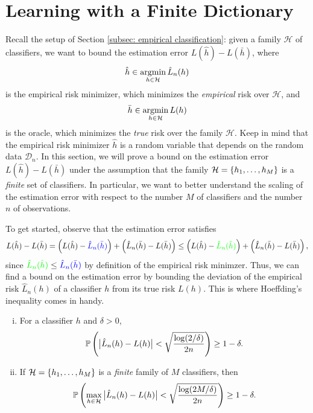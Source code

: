 \section{Learning with a Finite Dictionary}

Recall the setup of Section \ref{subsec: empirical classification}: given a family $\mathcal{H}$ of classifiers, we want to bound the estimation error $L(\hat h) - L(\bar h)$, where
\[
    \hat h \in \operatorname*{argmin}_{h \in \mathcal{H}} \hat L_n(h)
\]
is the empirical risk minimizer, which minimizes the \emph{empirical} risk over $\mathcal{H}$, and
\[
    \bar h \in \operatorname*{argmin}_{h \in \mathcal{H}} L(h)
\]
is the oracle, which minimizes the \emph{true} risk over the family $\mathcal{H}$. Keep in mind that the empirical risk minimizer $\hat h$ is a random variable that depends on the random data $\mathcal{D}_n$. In this section, we will prove a bound on the estimation error $L(\hat h) - L(\bar h)$ under the assumption that the family $\mathcal{H} = \left\{h_1, \dots, h_M\right\}$ is a \emph{finite} set of classifiers. In particular, we want to better understand the scaling of the estimation error with respect to the number $M$ of classifiers and the number $n$ of observations.

To get started, observe that the estimation error satisfies
\[
    L(\hat h) - L(\bar h) %
    = \left(L(\hat h) - {\color{blue} \hat L_n(\bar h)}\right) + \left(\hat L_n(\bar h) - L(\bar h)\right) %
    \leq \left(L(\hat h) - {\color{green} \hat L_n(\hat h)}\right) + \left(\hat L_n(\bar h) - L(\bar h)\right),
\]
since ${\color{green} \hat L_n(\hat h)} \leq {\color{blue} \hat L_n(\bar h)}$ by definition of the empirical risk minimzer. Thus, we can find a bound on the estimation error by bounding the deviation of the empirical risk $\hat L_n(h)$ of a classifier $h$ from its true risk $L(h)$. This is where Hoeffding's inequality comes in handy.

\begin{theorem}
\label{thm: empirical vs true risk}
\begin{enumerate}[(i)]
    \item For a classifier $h$ and $\delta > 0$,
    \[
        \mathbb{P}\left(\big\lvert \hat L_n(h) - L(h) \big\rvert < \sqrt{\frac{\log(2/\delta)}{2n}}\right) \geq 1 - \delta.
    \]

    \item If $\mathcal{H} = \left\{h_1, \dots, h_M\right\}$ is a \emph{finite} family of $M$ classifiers, then
    \[
        \mathbb{P}\left(\max_{h \in \mathcal{H}} \big\lvert \hat L_n(h) - L(h) \big\rvert < \sqrt{\frac{\log(2M/\delta)}{2n}}\right) \geq 1 - \delta.
    \]
\end{enumerate}
\end{theorem}

